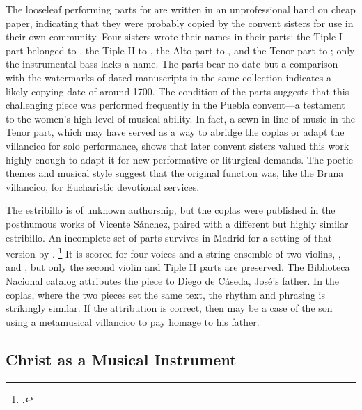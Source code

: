 The looseleaf performing parts for  are written in an
unprofessional hand on cheap paper, indicating that they were probably copied
by the convent sisters for use in their own community.
Four sisters wrote their names in their parts:
the Tiple I part belonged to , the Tiple II to , the Alto part to , and the Tenor part
to ; only the instrumental bass lacks a name.
The parts bear no date but a comparison with the watermarks of dated
manuscripts in the same collection indicates a likely copying date of around
1700.
The condition of the parts suggests that this challenging piece was performed
frequently in the Puebla convent---a testament to the women's high level of
musical ability.
In fact, a sewn-in line of music in the Tenor part, which may have served as a
way to abridge the coplas or adapt the villancico for solo performance, shows
that later convent sisters valued this work highly enough to adapt it for new
performative or liturgical demands.
The poetic themes and musical style suggest that the original function was,
like the Bruna villancico, for Eucharistic devotional services.

The estribillo is of unknown authorship, but the coplas were published in the
posthumous works of Vicente Sánchez, paired with a different but highly similar
estribillo.%
   \Autocite
   [190--191:
   ]
   {Sanchez:LiraPoetica}  
An incomplete set of parts survives in Madrid for a setting of that version by
.%
    \footnote{.}
It is scored for four voices and a string ensemble of two violins,
, and , but only the second violin and Tiple
II parts are preserved.
The Biblioteca Nacional catalog attributes the piece to Diego de Cáseda, José's
father.
In the coplas, where the two pieces set the same text, the rhythm and phrasing
is strikingly similar.
If the attribution is correct, then  may be a case of
the son using a metamusical villancico to pay homage to his father.

\subsection{Christ as a Musical Instrument}

